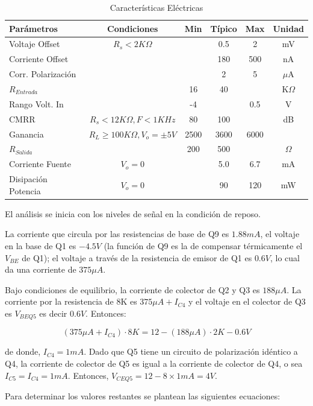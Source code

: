 \begin{table}[h]
	\centering
	\begin{tabular}{|l|c|c|c|c|c|}
		\hline
		\textbf{Parámetros} & \textbf{Condiciones} & \textbf{Min} & \textbf{Típico} & \textbf{Max} & \textbf{Unidad} \\
		\hline
		Voltaje Offset & $R_s < 2K\Omega$ & & 0.5 & 2 & mV \\
		Corriente Offset & & & 180 & 500 & nA \\
		Corr. Polarización & & & 2 & 5 & $\mu$A \\
		$R_{Entrada}$ &  & 16 & 40 &  & K$\Omega$ \\
		Rango Volt. In &  & -4 & & 0.5 & V \\
		CMRR & $R_s < 12K\Omega, F<1KHz$ & 80 & 100 & & dB \\
		Ganancia & $R_L \geq 100K\Omega, V_o = \pm5V$ & 2500 & 3600 & 6000 &  \\
		$R_{Salida}$ &  & 200 & 500 & & $\Omega$ \\
		Corriente Fuente & $V_o = 0$ & & 5.0 & 6.7 & mA \\
		Disipación Potencia & $V_o = 0$ & & 90 & 120 & mW \\
		\hline
	\end{tabular}
	\caption{Características Eléctricas}
\end{table}

El análisis se inicia con los niveles de señal en la condición de reposo.

La corriente que circula por las resistencias de base de Q9 es \( 1.88 mA \), el voltaje en la base de Q1 es \( -4.5V \) (la función de Q9 es la de compensar térmicamente el $V_{BE}$ de Q1); el voltaje a través de la resistencia de emisor de Q1 es \( 0.6V \), lo cual da una corriente de \( 375 \mu A \). 

Bajo condiciones de equilibrio, la corriente de colector de Q2 y Q3 es \( 188 \mu A \). La corriente por la resistencia de 8K es \( 375 \mu A + I_{C4} \) y el voltaje en el colector de Q3 es \( V_{BEQ5} \) es decir \( 0.6 V \). Entonces:

\[
(375\mu A + I_{C4}) \cdot 8K = 12 - (188\mu A) \cdot 2K - 0.6V
\]

de donde, \( I_{C4} = 1mA \). Dado que Q5 tiene un circuito de polarización idéntico a Q4, la corriente de colector de Q5 es igual a la corriente de colector de Q4, o sea \( I_{C5} = I_{C4} = 1mA \). Entonces, \( V_{CEQ5} = 12 - 8 \times 1mA = 4V \).

Para determinar los valores restantes se plantean las siguientes ecuaciones:


